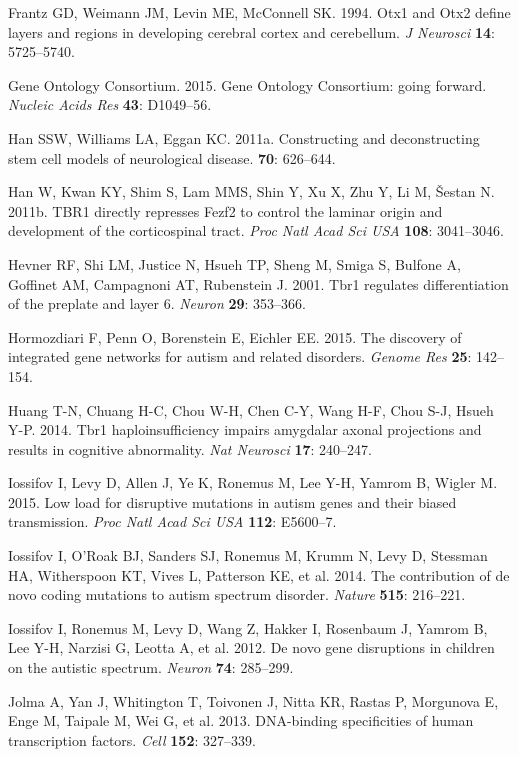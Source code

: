 \documentclass[]{article}
\begin{document}
Frantz GD, Weimann JM, Levin ME, McConnell SK. 1994. Otx1 and Otx2
define layers and regions in developing cerebral cortex and cerebellum.
\emph{J Neurosci} \textbf{14}: 5725--5740.

Gene Ontology Consortium. 2015. Gene Ontology Consortium: going forward.
\emph{Nucleic Acids Res} \textbf{43}: D1049--56.

Han SSW, Williams LA, Eggan KC. 2011a. Constructing and deconstructing
stem cell models of neurological disease. \textbf{70}: 626--644.

Han W, Kwan KY, Shim S, Lam MMS, Shin Y, Xu X, Zhu Y, Li M, Šestan N.
2011b. TBR1 directly represses Fezf2 to control the laminar origin and
development of the corticospinal tract. \emph{Proc Natl Acad Sci USA}
\textbf{108}: 3041--3046.

Hevner RF, Shi LM, Justice N, Hsueh TP, Sheng M, Smiga S, Bulfone A,
Goffinet AM, Campagnoni AT, Rubenstein J. 2001. Tbr1 regulates
differentiation of the preplate and layer 6. \emph{Neuron} \textbf{29}:
353--366.

Hormozdiari F, Penn O, Borenstein E, Eichler EE. 2015. The discovery of
integrated gene networks for autism and related disorders. \emph{Genome
Res} \textbf{25}: 142--154.

Huang T-N, Chuang H-C, Chou W-H, Chen C-Y, Wang H-F, Chou S-J, Hsueh
Y-P. 2014. Tbr1 haploinsufficiency impairs amygdalar axonal projections
and results in cognitive abnormality. \emph{Nat Neurosci} \textbf{17}:
240--247.

Iossifov I, Levy D, Allen J, Ye K, Ronemus M, Lee Y-H, Yamrom B, Wigler
M. 2015. Low load for disruptive mutations in autism genes and their
biased transmission. \emph{Proc Natl Acad Sci USA} \textbf{112}:
E5600--7.

Iossifov I, O'Roak BJ, Sanders SJ, Ronemus M, Krumm N, Levy D, Stessman
HA, Witherspoon KT, Vives L, Patterson KE, et al. 2014. The contribution
of de novo coding mutations to autism spectrum disorder. \emph{Nature}
\textbf{515}: 216--221.

Iossifov I, Ronemus M, Levy D, Wang Z, Hakker I, Rosenbaum J, Yamrom B,
Lee Y-H, Narzisi G, Leotta A, et al. 2012. De novo gene disruptions in
children on the autistic spectrum. \emph{Neuron} \textbf{74}: 285--299.

Jolma A, Yan J, Whitington T, Toivonen J, Nitta KR, Rastas P, Morgunova
E, Enge M, Taipale M, Wei G, et al. 2013. DNA-binding specificities of
human transcription factors. \emph{Cell} \textbf{152}: 327--339.
\end{document}
